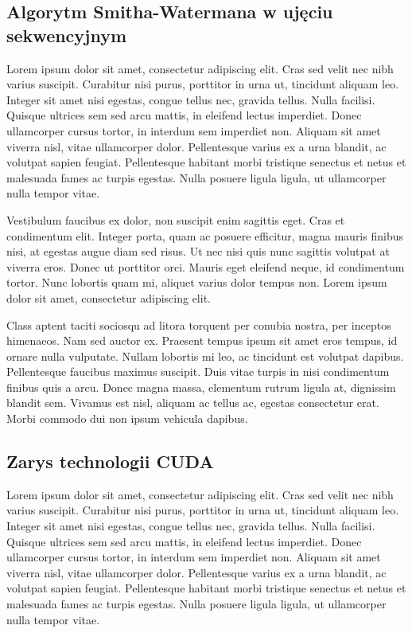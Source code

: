 \documentclass[a4paper,12pt]{article}
\begin{document}
\subsection*{Algorytm Smitha-Watermana w ujęciu sekwencyjnym}
Lorem ipsum dolor sit amet, consectetur adipiscing elit. Cras sed velit nec nibh varius suscipit. Curabitur nisi purus, porttitor in urna ut, tincidunt aliquam leo. Integer sit amet nisi egestas, congue tellus nec, gravida tellus. Nulla facilisi. Quisque ultrices sem sed arcu mattis, in eleifend lectus imperdiet. Donec ullamcorper cursus tortor, in interdum sem imperdiet non. Aliquam sit amet viverra nisl, vitae ullamcorper dolor. Pellentesque varius ex a urna blandit, ac volutpat sapien feugiat. Pellentesque habitant morbi tristique senectus et netus et malesuada fames ac turpis egestas. Nulla posuere ligula ligula, ut ullamcorper nulla tempor vitae.

Vestibulum faucibus ex dolor, non suscipit enim sagittis eget. Cras et condimentum elit. Integer porta, quam ac posuere efficitur, magna mauris finibus nisi, at egestas augue diam sed risus. Ut nec nisi quis nunc sagittis volutpat at viverra eros. Donec ut porttitor orci. Mauris eget eleifend neque, id condimentum tortor. Nunc lobortis quam mi, aliquet varius dolor tempus non. Lorem ipsum dolor sit amet, consectetur adipiscing elit.

Class aptent taciti sociosqu ad litora torquent per conubia nostra, per inceptos himenaeos. Nam sed auctor ex. Praesent tempus ipsum sit amet eros tempus, id ornare nulla vulputate. Nullam lobortis mi leo, ac tincidunt est volutpat dapibus. Pellentesque faucibus maximus suscipit. Duis vitae turpis in nisi condimentum finibus quis a arcu. Donec magna massa, elementum rutrum ligula at, dignissim blandit sem. Vivamus est nisl, aliquam ac tellus ac, egestas consectetur erat. Morbi commodo dui non ipsum vehicula dapibus.
\subsection*{Zarys technologii CUDA}
Lorem ipsum dolor sit amet, consectetur adipiscing elit. Cras sed velit nec nibh varius suscipit. Curabitur nisi purus, porttitor in urna ut, tincidunt aliquam leo. Integer sit amet nisi egestas, congue tellus nec, gravida tellus. Nulla facilisi. Quisque ultrices sem sed arcu mattis, in eleifend lectus imperdiet. Donec ullamcorper cursus tortor, in interdum sem imperdiet non. Aliquam sit amet viverra nisl, vitae ullamcorper dolor. Pellentesque varius ex a urna blandit, ac volutpat sapien feugiat. Pellentesque habitant morbi tristique senectus et netus et malesuada fames ac turpis egestas. Nulla posuere ligula ligula, ut ullamcorper nulla tempor vitae.
\end{document}
